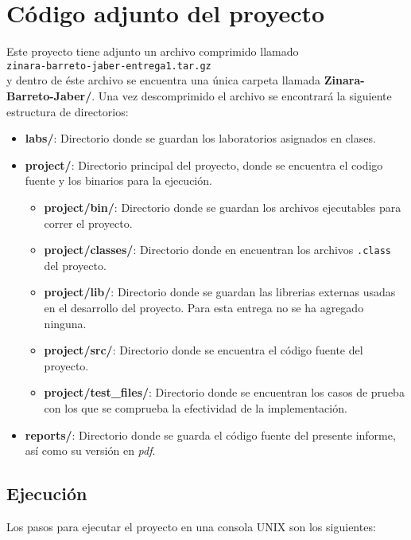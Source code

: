 \documentclass[12pt, spanish]{report}
\begin{document}
\section{C\'odigo adjunto del proyecto}
\label{sec:correr}

Este proyecto tiene adjunto un archivo comprimido llamado\\

\texttt{zinara-barreto-jaber-entrega1.tar.gz}\\

y dentro de éste archivo se encuentra una única carpeta llamada
\textbf{Zinara-Barreto-Jaber/}. Una vez descomprimido el archivo se
encontrar\'a la siguiente estructura de directorios:

\begin{itemize}
 \item \textbf{labs/}: Directorio donde se guardan los laboratorios
       asignados en clases.
 \item \textbf{project/}: Directorio principal del proyecto, donde se
       encuentra el codigo fuente y los binarios para la ejecuci\'on.
 \begin{itemize}
  \item \textbf{project/bin/}: Directorio donde se guardan los
	archivos ejecutables para correr el proyecto.
  \item \textbf{project/classes/}: Directorio donde en encuentran los
	archivos \texttt{.class} del proyecto.
  \item \textbf{project/lib/}: Directorio donde se guardan las
	librerias externas usadas en el desarrollo del proyecto. Para esta
	entrega no se ha agregado ninguna.
  \item \textbf{project/src/}: Directorio donde se encuentra el c\'odigo
	fuente del proyecto.
  \item \textbf{project/test\_files/}: Directorio donde se encuentran los
	casos de prueba con los que se comprueba la efectividad de la implementaci\'on.
 \end{itemize}
 \item \textbf{reports/}: Directorio donde se guarda el c\'odigo fuente
       del presente informe, as\'i como su versi\'on en \emph{pdf}.
\end{itemize}

\subsection{Ejecuci\'on}
\label{sec:zejecucion}
Los pasos para ejecutar el proyecto en una consola UNIX son los
siguientes:
  
\end{document}
